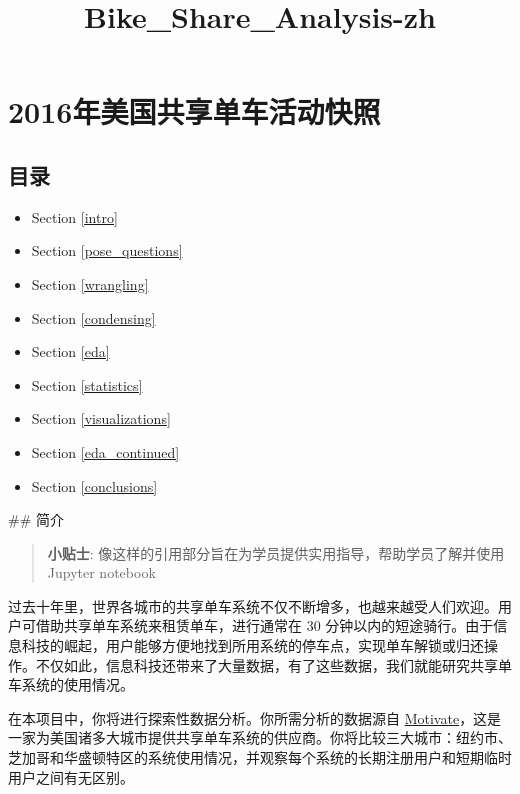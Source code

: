 \documentclass[11pt]{article}
\title{Bike\_Share\_Analysis-zh}
\providecommand{\tightlist}{%
      \setlength{\itemsep}{0pt}\setlength{\parskip}{0pt}}
\begin{document}
    
    
    \maketitle
    
    

    
    \section{2016年美国共享单车活动快照}\label{ux5e74ux7f8eux56fdux5171ux4eabux5355ux8f66ux6d3bux52a8ux5febux7167}

\subsection{目录}\label{ux76eeux5f55}

\begin{itemize}
\tightlist
\item
  Section \ref{intro}
\item
  Section \ref{pose_questions}
\item
  Section \ref{wrangling}
\item
  Section \ref{condensing}
\item
  Section \ref{eda}
\item
  Section \ref{statistics}
\item
  Section \ref{visualizations}
\item
  Section \ref{eda_continued}
\item
  Section \ref{conclusions}
\end{itemize}

 \#\# 简介

\begin{quote}
\textbf{小贴士}:
像这样的引用部分旨在为学员提供实用指导，帮助学员了解并使用 Jupyter
notebook
\end{quote}

过去十年里，世界各城市的共享单车系统不仅不断增多，也越来越受人们欢迎。用户可借助共享单车系统来租赁单车，进行通常在
30
分钟以内的短途骑行。由于信息科技的崛起，用户能够方便地找到所用系统的停车点，实现单车解锁或归还操作。不仅如此，信息科技还带来了大量数据，有了这些数据，我们就能研究共享单车系统的使用情况。

在本项目中，你将进行探索性数据分析。你所需分析的数据源自
\href{https://www.motivateco.com/}{Motivate}，这是一家为美国诸多大城市提供共享单车系统的供应商。你将比较三大城市：纽约市、芝加哥和华盛顿特区的系统使用情况，并观察每个系统的长期注册用户和短期临时用户之间有无区别。
\end{document}
